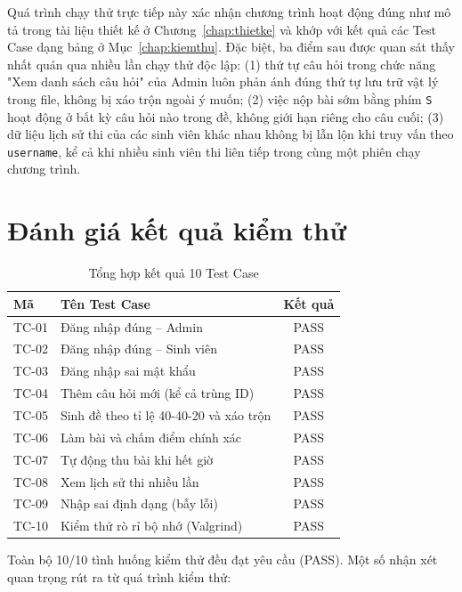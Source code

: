 \documentclass[11pt]{report}
\begin{document}
Quá trình chạy thử trực tiếp này xác nhận chương trình hoạt động đúng như mô tả trong tài liệu thiết kế ở Chương~\ref{chap:thietke} và khớp với kết quả các Test Case dạng bảng ở Mục~\ref{chap:kiemthu}. Đặc biệt, ba điểm sau được quan sát thấy nhất quán qua nhiều lần chạy thử độc lập: (1) thứ tự câu hỏi trong chức năng "Xem danh sách câu hỏi" của Admin luôn phản ánh đúng thứ tự lưu trữ vật lý trong file, không bị xáo trộn ngoài ý muốn; (2) việc nộp bài sớm bằng phím \texttt{S} hoạt động ở bất kỳ câu hỏi nào trong đề, không giới hạn riêng cho câu cuối; (3) dữ liệu lịch sử thi của các sinh viên khác nhau không bị lẫn lộn khi truy vấn theo \texttt{username}, kể cả khi nhiều sinh viên thi liên tiếp trong cùng một phiên chạy chương trình.

\section{Đánh giá kết quả kiểm thử}

\begin{table}[H]
    \centering
    \begin{tabularx}{\textwidth}{|l|X|c|} \hline
        \textbf{Mã} & \textbf{Tên Test Case} & \textbf{Kết quả} \\ \hline
        TC-01 & Đăng nhập đúng -- Admin & PASS \\ \hline
        TC-02 & Đăng nhập đúng -- Sinh viên & PASS \\ \hline
        TC-03 & Đăng nhập sai mật khẩu & PASS \\ \hline
        TC-04 & Thêm câu hỏi mới (kể cả trùng ID) & PASS \\ \hline
        TC-05 & Sinh đề theo tỉ lệ 40-40-20 và xáo trộn & PASS \\ \hline
        TC-06 & Làm bài và chấm điểm chính xác & PASS \\ \hline
        TC-07 & Tự động thu bài khi hết giờ & PASS \\ \hline
        TC-08 & Xem lịch sử thi nhiều lần & PASS \\ \hline
        TC-09 & Nhập sai định dạng (bẫy lỗi) & PASS \\ \hline
        TC-10 & Kiểm thử rò rỉ bộ nhớ (Valgrind) & PASS \\ \hline
    \end{tabularx}
    \caption{Tổng hợp kết quả 10 Test Case}
    \label{tab:testsummary}
\end{table}

Toàn bộ 10/10 tình huống kiểm thử đều đạt yêu cầu (PASS). Một số nhận xét quan trọng rút ra từ quá trình kiểm thử:
\end{document}
